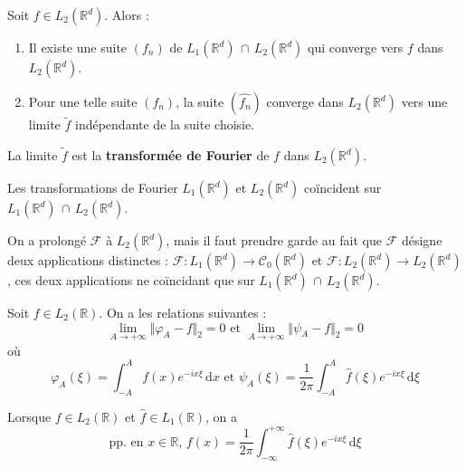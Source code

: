  \begin{theorem}
    Soit $f \in L_2(\mathbb{R}^d)$. Alors :
    \begin{enumerate}[label=(\roman*)]
      \item Il existe une suite $(f_n)$ de $L_1(\mathbb{R}^d) \, \cap \, L_2(\mathbb{R}^d)$ qui converge vers $f$ dans $L_2(\mathbb{R}^d)$.
      \item Pour une telle suite $(f_n)$, la suite $(\widehat{f_n})$ converge dans $L_2(\mathbb{R}^d)$ vers une limite $\widetilde{f}$ indépendante de la suite choisie.
    \end{enumerate}
  \end{theorem}

  \begin{definition}
    La limite $\widetilde{f}$ est la \textbf{transformée de Fourier} de $f$ dans $L_2(\mathbb{R}^d)$.
  \end{definition}

  \begin{proposition}
    Les transformations de Fourier $L_1(\mathbb{R}^d)$ et $L_2(\mathbb{R}^d)$ coïncident sur $L_1(\mathbb{R}^d) \, \cap \, L_2(\mathbb{R}^d)$.
  \end{proposition}

  \begin{remark}
    On a prolongé $\mathcal{F}$ à $L_2(\mathbb{R}^d)$, mais il faut prendre garde au fait que $\mathcal{F}$ désigne deux applications distinctes : $\mathcal{F} : L_1(\mathbb{R}^d) \rightarrow \mathcal{C}_0(\mathbb{R}^d)$ et $\mathcal{F} : L_2(\mathbb{R}^d) \rightarrow L_2(\mathbb{R}^d)$, ces deux applications ne coïncidant que sur $L_1(\mathbb{R}^d) \, \cap \, L_2(\mathbb{R}^d)$.
  \end{remark}

  \begin{proposition}
    Soit $f \in L_2(\mathbb{R})$. On a les relations suivantes :
    \[ \lim_{A \rightarrow +\infty} \Vert \varphi_A - f \Vert_2 = 0 \text{ et } \lim_{A \rightarrow +\infty} \Vert \psi_A - f \Vert_2 = 0 \]
    où
    \[ \varphi_A(\xi) = \int_{-A}^{A} f(x) e^{-ix\xi} \, \mathrm{d}x \text{ et } \psi_A(\xi) = \frac{1}{2 \pi} \int_{-A}^{A} \widehat{f}(\xi) e^{-ix\xi} \, \mathrm{d}\xi \]
  \end{proposition}

  \begin{corollary}
    Lorsque $f \in L_2(\mathbb{R})$ et $\widehat{f} \in L_1(\mathbb{R})$, on a
    \[ \text{pp. en } x \in \mathbb{R}, \, f(x) = \frac{1}{2 \pi} \int_{-\infty}^{+\infty} \widehat{f}(\xi) e^{-ix\xi} \, \mathrm{d}\xi \]
  \end{corollary}

